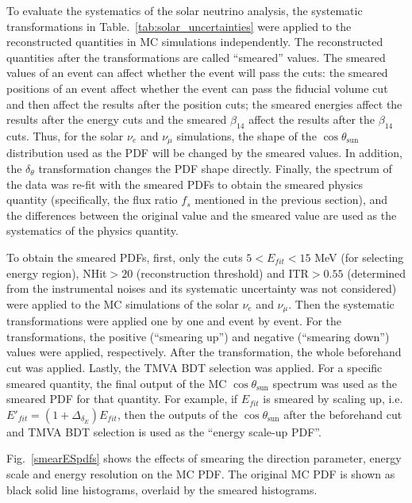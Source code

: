 To evaluate the systematics of the solar neutrino analysis, the systematic transformations in Table.~\ref{tab:solar_uncertainties} were applied to the reconstructed quantities in MC simulations independently. The reconstructed quantities after the transformations are called ``smeared'' values. The smeared values of an event can affect whether the event will pass the cuts: the smeared positions of an event affect whether the event can pass the fiducial volume cut and then affect the results after the position cuts; the smeared energies affect the results after the energy cuts and the smeared $\beta_{14}$ affect the results after the $\beta_{14}$ cuts. Thus, for the solar $\nu_e$ and $\nu_\mu$ simulations, the shape of the $\cos\theta_\mathrm{sun}$ distribution used as the PDF will be changed by the smeared values. In addition, the $\delta_\theta$ transformation changes the PDF shape directly. Finally, the spectrum of the data was re-fit with the smeared PDFs to obtain the smeared physics quantity (specifically, the flux ratio $f_s$ mentioned in the previous section), and the differences between the original value and the smeared value are used as the systematics of the physics quantity.

To obtain the smeared PDFs, first, only the cuts $5<E_{fit}<15$ MeV (for selecting energy region), NHit$>20$ (reconstruction threshold) and ITR$>0.55$ (determined from the instrumental noises and its systematic uncertainty was not considered) were applied to the MC simulations of the solar $\nu_e$ and $\nu_\mu$. Then the systematic transformations were applied one by one and event by event. For the transformations, the positive (``smearing up'') and negative (``smearing down'') values were applied, respectively. After the transformation, the whole beforehand cut was applied. Lastly, the TMVA BDT selection was applied. For a specific smeared quantity, the final output of the MC $\cos\theta_\mathrm{sun}$ spectrum was used as the smeared PDF for that quantity. For example, if $E_{fit}$ is smeared by scaling up, i.e. $E'_{fit}=(1+\Delta_{\delta_E})E_{fit}$, then the outputs of the $\cos\theta_\mathrm{sun}$ after the beforehand cut and TMVA BDT selection is used as the ``energy scale-up PDF''.

Fig.~\ref{smearESpdfs} shows the effects of smearing the direction parameter, energy scale and energy resolution on the MC PDF. The original MC PDF is shown as black solid line histograms, overlaid by the smeared histograms.

